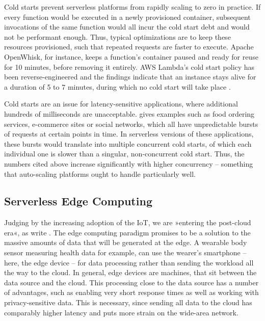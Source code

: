 Cold starts prevent serverless platforms from rapidly scaling to zero in practice. If every function would be executed in a newly provisioned container, subsequent invocations of the same function would all incur the cold start debt and would not be performant enough. Thus, typical optimizations are to keep these resources provisioned, such that repeated requests are faster to execute. Apache OpenWhisk, for instance, keeps a function's container paused and ready for reuse for 10 minutes, before removing it entirely. AWS Lambda's cold start policy has been reverse-engineered and the findings indicate that an instance stays alive for a duration of 5 to 7 minutes, during which no cold start will take place \cite{ShilCold2021}.

Cold starts are an issue for latency-sensitive applications, where additional hundreds of milliseconds are unacceptable. \citeauthor{Cui2018} gives examples such as food ordering services, e-commerce sites or social networks, which all have unpredictable bursts of requests at certain points in time. In serverless versions of these applications, these bursts would translate into multiple concurrent cold starts, of which each individual one is slower than a singular, non-concurrent cold start. Thus, the numbers cited above increase significantly with higher concurrency \cite{Mohan2019, Cui2018} -- something that auto-scaling platforms ought to handle particularly well.

\subsection{Serverless Edge Computing}


Judging by the increasing adoption of the IoT, we are »entering the post-cloud era«, as \citeauthor{Shi2016} write \cite{Shi2016}. The edge computing paradigm promises to be a solution to the massive amounts of data that will be generated at the edge. A wearable body sensor measuring health data for example, can use the wearer's smartphone -- here, the edge device -- for data processing rather than sending the workload all the way to the cloud. In general, edge devices are machines, that sit between the data source and the cloud. This processing close to the data source has a number of advantages, such as enabling very short response times as well as working with privacy-sensitive data. This is necessary, since sending all data to the cloud has comparably higher latency and puts more strain on the wide-area network.

